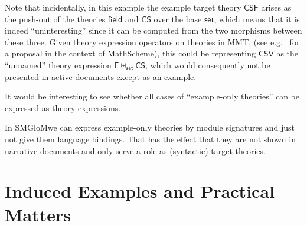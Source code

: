 \documentclass[11pt]{bluenote}
\def\cn#1{\mathsf{#1}}
\def\mmt{MMT\xspace}
\def\smglom{SMGloM}
\begin{document}
Note that incidentally, in this example the example target theory $\cn{CSF}$ arises as the
push-out of the theories $\cn{field}$ and $\cn{CS}$ over the base $\cn{set}$, which means
that it is indeed ``uninteresting'' since it can be computed from the two morphisms
between these three.  Given theory expression operators on theories in \mmt, (see
e.g.~\cite{CarCon:tpc12} for a proposal in the context of MathScheme), this could be
representing $\cn{CSV}$ as the ``unnamed'' theory expression
$\cn{F}\uplus_{\cn{set}}\cn{CS}$, which would consequently not be presented in active
documents except as an example.

It would be interesting to see whether all cases of ``example-only theories'' can be
expressed as theory expressions.

In \smglom we can express example-only theories by module signatures and just not give
them language bindings. That has the effect that they are not shown in narrative
documents and only serve a role as (syntactic) target theories. 

\section{Induced Examples and Practical Matters}
\end{document}

